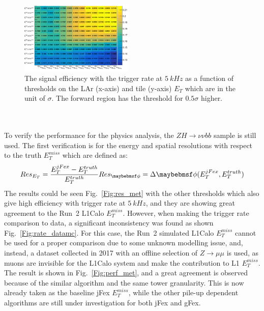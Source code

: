 \begin{figure}[!h]                
	\includegraphics[width=0.48\textwidth]{Chapter6/efficiency_5kHz_cfg1.png}
		\begin{center}
		\caption{The signal efficiency with the trigger rate at $5~kHz$ as a function of thresholds on the LAr (x-axis) and tile (y-axis) $E_{T}$ which are in the unit of $\sigma$. The forward region has the threshold for $0.5\sigma$ higher.}
		\label{Fig:thresold_scan_1}            
	\end{center}
\end{figure}
\noindent
\\
\\To verify the performance for the physics analysis, the $ZH\to\nu\nu bb$ sample is still used. The first verification is for the energy and spatial resolutions with respect to the truth $E^{miss}_{T}$ which are defined as:
\begin{equation}
Res_{E_{T}} = \frac{E^{jFex}_{T}-E^{truth}_{T}}{E^{truth}_{T}} \\
Res_{\phi} = \Delta\phi(E^{jFex}_{T}, E^{truth}_{T})
\end{equation}
The results could be seen Fig.~\ref{Fig:res_met} with the other thresholds which also give high efficiency with trigger rate at $5~kHz$, and they are showing great agreement to the Run~2 L1Calo $E^{miss}_{T}$. However, when making the trigger rate comparison to data, a significant inconsistency was found as shown Fig.~\ref{Fig:rate_datamc}. For this case, the Run~2 simulated L1Calo $E^{miss}_{T}$ cannot be used for a proper comparison due to some unknown modelling issue, and, instead, a dataset collected in 2017 with an offline selection of $Z\to\mu\mu$ is used, as muons are invisible for the L1Calo system and make the contribution to L1 $E^{miss}_{T}$. The result is shown in Fig.~\ref{Fig:perf_met}, and a great agreement is observed because of the similar algorithm and the same tower granularity. This is now already taken as the baseline jFex $E^{miss}_{T}$, while the other pile-up dependent algorithms are still under investigation for both jFex and gFex. 
